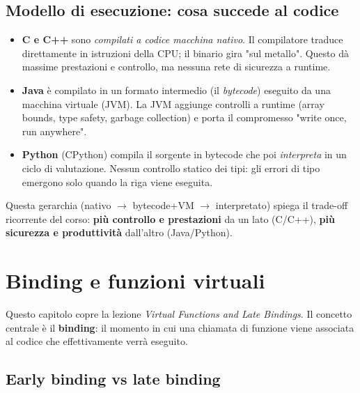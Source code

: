 \documentclass{report}
\begin{document}

\section{Modello di esecuzione: cosa succede al codice}

\begin{itemize}
    \item \textbf{C e C++} sono \emph{compilati a codice macchina nativo}. Il
    compilatore traduce direttamente in istruzioni della CPU; il binario gira
    "sul metallo". Questo dà massime prestazioni e controllo, ma nessuna rete
    di sicurezza a runtime.
    \item \textbf{Java} è compilato in un formato intermedio (il
    \emph{bytecode}) eseguito da una macchina virtuale (JVM). La JVM aggiunge
    controlli a runtime (array bounds, type safety, garbage collection) e
    porta il compromesso "write once, run anywhere".
    \item \textbf{Python} (CPython) compila il sorgente in bytecode che poi
    \emph{interpreta} in un ciclo di valutazione. Nessun controllo statico dei
    tipi: gli errori di tipo emergono solo quando la riga viene eseguita.
\end{itemize}

Questa gerarchia (nativo $\to$ bytecode+VM $\to$ interpretato) spiega il
trade-off ricorrente del corso: \textbf{più controllo e prestazioni} da un
lato (C/C++), \textbf{più sicurezza e produttività} dall'altro (Java/Python).

\chapter{Binding e funzioni virtuali}

Questo capitolo copre la lezione \emph{Virtual Functions and Late Bindings}. Il
concetto centrale è il \textbf{binding}: il momento in cui una chiamata di
funzione viene associata al codice che effettivamente verrà eseguito.

\section{Early binding vs late binding}
\end{document}
